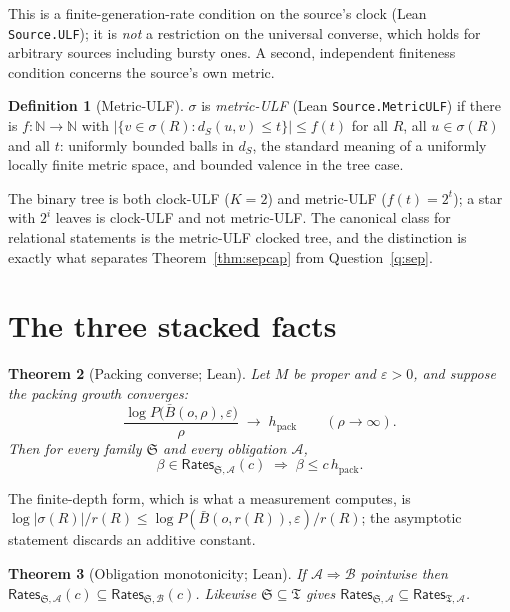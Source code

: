 \documentclass[11pt,a4paper]{article}
\theoremstyle{plain}
\newtheorem{theorem}{Theorem}
\theoremstyle{definition}
\newtheorem{definition}[theorem]{Definition}
\theoremstyle{remark}
\newcommand{\Rates}{\mathsf{Rates}}
\newcommand{\hpack}{h_{\mathrm{pack}}}
\begin{document}
This is a finite-generation-rate condition on the source's clock (Lean
\texttt{Source.ULF}); it is \emph{not} a restriction on the universal
converse, which holds for arbitrary sources including bursty ones. A second,
independent finiteness condition concerns the source's own metric.

\begin{definition}[Metric-ULF]
$\sigma$ is \emph{metric-ULF} (Lean \texttt{Source.MetricULF}) if there is
$f:\mathbb N\to\mathbb N$ with
$|\{v\in\sigma(R): d_S(u,v)\le t\}|\le f(t)$ for all $R$, all $u\in\sigma(R)$
and all $t$: uniformly bounded balls in $d_S$, the standard meaning of a
uniformly locally finite metric space, and bounded valence in the tree case.
\end{definition}

The binary tree is both clock-ULF ($K=2$) and metric-ULF ($f(t)=2^t$); a star
with $2^i$ leaves is clock-ULF and not metric-ULF. The canonical class for
relational statements is the metric-ULF clocked tree, and the distinction is
exactly what separates Theorem~\ref{thm:sepcap} from Question~\ref{q:sep}.

\section{The three stacked facts}

\begin{theorem}[Packing converse; Lean]\label{thm:converse}
Let $M$ be proper and $\varepsilon>0$, and suppose the packing growth
converges:
\[
  \frac{\log P\bigl(\bar B(o,\rho),\varepsilon\bigr)}{\rho}
  \;\longrightarrow\; \hpack \qquad (\rho\to\infty).
\]
Then for every family $\mathfrak S$ and every obligation $\mathcal A$,
\[
  \beta \in \Rates_{\mathfrak S,\mathcal A}(c)
  \;\Longrightarrow\;
  \beta \le c\,\hpack .
\]
\end{theorem}

The finite-depth form, which is what a measurement computes, is
$\log|\sigma(R)|/r(R) \le \log P(\bar B(o,r(R)),\varepsilon)/r(R)$; the
asymptotic statement discards an additive constant.

\begin{theorem}[Obligation monotonicity; Lean]
If $\mathcal A \Rightarrow \mathcal B$ pointwise then
$\Rates_{\mathfrak S,\mathcal A}(c) \subseteq \Rates_{\mathfrak S,\mathcal B}(c)$.
Likewise $\mathfrak S\subseteq\mathfrak T$ gives
$\Rates_{\mathfrak S,\mathcal A}\subseteq\Rates_{\mathfrak T,\mathcal A}$.
\end{theorem}
\end{document}
